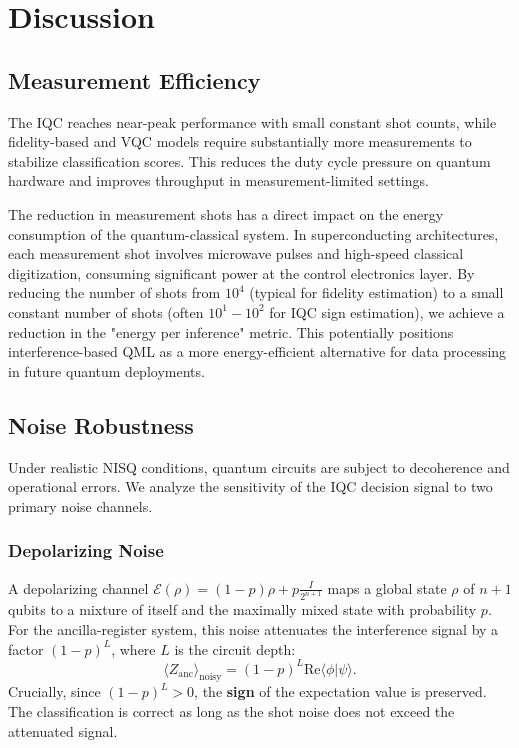 \documentclass[conference]{IEEEtran}
\begin{document}
\section{Discussion}

\subsection{Measurement Efficiency}
The IQC reaches near-peak performance with small constant shot counts, while fidelity-based and VQC models require substantially more measurements to stabilize classification scores. This reduces the duty cycle pressure on quantum hardware and improves throughput in measurement-limited settings.

The reduction in measurement shots has a direct impact on the energy consumption of the quantum-classical system. In superconducting architectures, each measurement shot involves microwave pulses and high-speed classical digitization, consuming significant power at the control electronics layer. By reducing the number of shots from $10^4$ (typical for fidelity estimation) to a small constant number of shots (often $10^1-10^2$ for IQC sign estimation), we achieve a reduction in the "energy per inference" metric. This potentially positions interference-based QML as a more energy-efficient alternative for data processing in future quantum deployments.

\subsection{Noise Robustness}
Under realistic NISQ conditions, quantum circuits are subject to decoherence and operational errors. We analyze the sensitivity of the IQC decision signal to two primary noise channels.

\subsubsection{Depolarizing Noise}
A depolarizing channel $\mathcal{E}(\rho) = (1-p)\rho + p\frac{I}{2^{n+1}}$ maps a global state $\rho$ of $n+1$ qubits to a mixture of itself and the maximally mixed state with probability $p$. For the ancilla-register system, this noise attenuates the interference signal by a factor $(1-p)^L$, where $L$ is the circuit depth:
\begin{equation}
    \langle Z_{\text{anc}} \rangle_{\text{noisy}} = (1-p)^L \mathrm{Re}\langle \phi | \psi \rangle.
\end{equation}
Crucially, since $(1-p)^L > 0$, the \textbf{sign} of the expectation value is preserved. The classification is correct as long as the shot noise does not exceed the attenuated signal.
\end{document}
